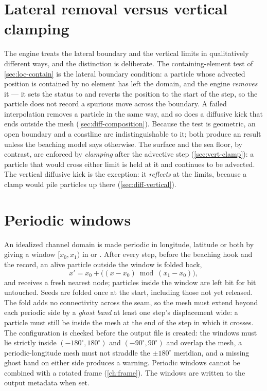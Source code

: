 \section{Lateral removal versus vertical clamping}\label{sec:life-bc}

The engine treats the lateral boundary and the vertical limits in qualitatively different ways, and the
distinction is deliberate. The containing-element test of \cref{sec:loc-contain} is the lateral boundary
condition: a particle whose advected position is contained by no element has left the domain, and the engine
\emph{removes} it --- it sets the status to  and reverts the position to the start of the step,
so the particle does not record a spurious move across the boundary. A failed interpolation removes a particle
in the same way, and so does a diffusive kick that ends outside the mesh (\cref{sec:diff-composition}).
Because the test is geometric, an open boundary and a coastline are indistinguishable to it; both produce an
 result unless the beaching model says otherwise. The surface and the sea floor, by contrast,
are enforced by \emph{clamping} after the advective step (\cref{sec:vert-clamp}): a particle that would cross
either limit is held at it and continues to be advected. The vertical diffusive kick is the exception: it
\emph{reflects} at the limits, because a clamp would pile particles up there (\cref{sec:diff-vertical}).

\section{Periodic windows}\label{sec:life-periodic}

An idealized channel domain is made periodic in longitude, latitude or both by giving a window
$[x_0,x_1)$ in  or . After every step, before the beaching hook and the
record, an alive particle outside the window is folded back,
\begin{equation}\label{eq:life-fold}
  x' = x_0 + \bigl((x-x_0)\bmod(x_1-x_0)\bigr),
\end{equation}
and receives a fresh nearest node; particles inside the window are left bit for bit untouched. Seeds are
folded once at the start, including those not yet released. The fold adds no connectivity across the seam, so
the mesh must extend beyond each periodic side by a \emph{ghost band} at least one step's displacement wide:
a particle must still be inside the mesh at the end of the step in which it crosses. The configuration is
checked before the output file is created: the windows must lie strictly inside $(-180^\circ,180^\circ)$ and
$(-90^\circ,90^\circ)$ and overlap the mesh, a periodic-longitude mesh must not straddle the $\pm180^\circ$
meridian, and a missing ghost band on either side produces a warning. Periodic windows cannot be combined with
a rotated frame (\cref{ch:frame}). The windows are written to the output metadata when set.

